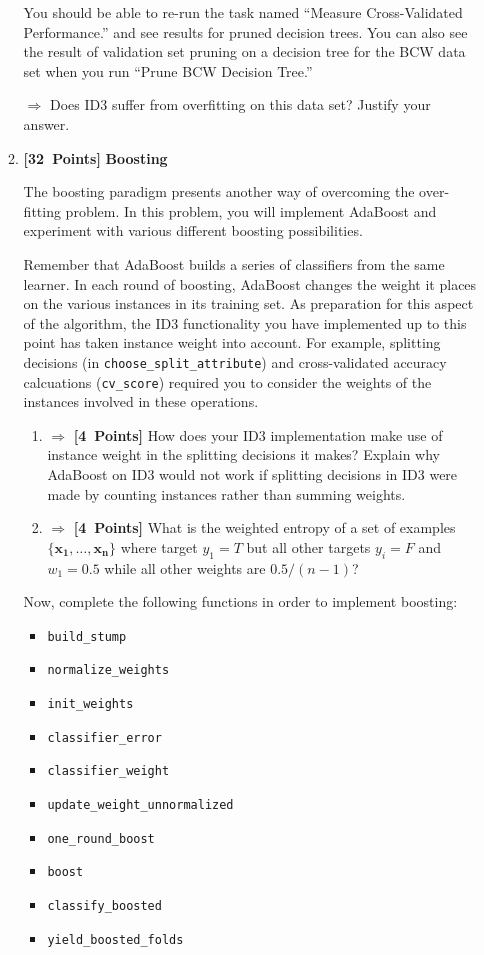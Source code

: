 \documentclass{article}
\newcommand{\points}[1]{\mbox{\textbf{[#1 Points]}}}
\begin{document}
\begin{enumerate}
\begin{enumerate}
  You should be able to re-run the task named ``Measure
  Cross-Validated Performance.'' and see results for pruned decision
  trees. You can also see the result of validation set pruning on a
  decision tree for the BCW data set when you run ``Prune BCW Decision
  Tree.''

  $\Rightarrow$ Does ID3 suffer from overfitting on this data set?
  Justify your answer.

\item \points{32} \textbf{Boosting}

The boosting paradigm presents another way of overcoming the
over-fitting problem.  In this problem,
you will implement AdaBoost and experiment with various different
boosting possibilities.

Remember that AdaBoost builds a series of classifiers from the same
learner. In each round of boosting, AdaBoost changes the weight it
places on the various instances in its training set. As preparation
for this aspect of the algorithm, the ID3 functionality you have
implemented up to this point has taken instance weight into
account. For example, splitting decisions (in
\verb=choose_split_attribute=) and cross-validated accuracy
calcuations (\verb=cv_score=) required you to consider the weights of
the instances involved in these operations.

\begin{enumerate}
\item $\Rightarrow$ \points{4} How does your ID3
implementation make use of instance weight in the splitting decisions
it makes? Explain why AdaBoost on ID3 would not work if splitting decisions
in ID3 were made by counting instances rather than summing weights.

 \item $\Rightarrow$ \points{4} What is the weighted entropy of a set of examples
   $\{\mathbf{x_1}, \ldots, \mathbf{x_n}\}$ where target $y_1 =
T$ but all other targets $y_i = F$ and $w_1 = 0.5$ while all other
weights are $0.5 / (n - 1)$?
\end{enumerate}

Now, complete the following functions in order to implement boosting:
\begin{itemize}
\item \verb=build_stump=
\item \verb=normalize_weights=
\item \verb=init_weights=
\item \verb=classifier_error=
\item \verb=classifier_weight=
\item \verb=update_weight_unnormalized=
\item \verb=one_round_boost=
\item \verb=boost=
\item \verb=classify_boosted=
\item \verb=yield_boosted_folds=
\end{itemize}


\end{enumerate}
\end{enumerate}
\end{document}
